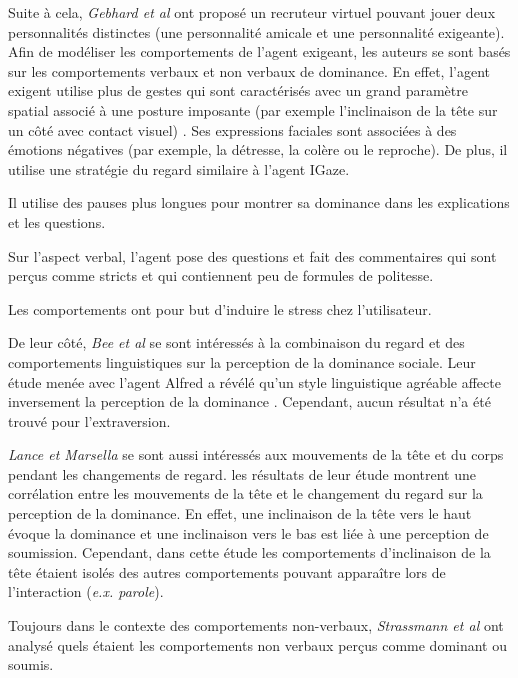 	Suite à cela, \emph{Gebhard et al} \cite{gebhard2014exploring} ont proposé un recruteur virtuel pouvant jouer deux personnalités distinctes (une personnalité amicale et une personnalité exigeante). Afin de modéliser les comportements de l'agent exigeant, les auteurs se sont basés sur les comportements verbaux et non verbaux de dominance. En effet, l'agent exigent utilise plus de gestes qui sont caractérisés avec un grand paramètre spatial associé à une posture imposante (par exemple l'inclinaison de la tête sur un côté avec  contact visuel) \cite{gebhard2014exploring}. Ses expressions faciales sont associées à des émotions négatives (par exemple, la détresse, la colère ou le reproche). De plus, il utilise une stratégie du regard similaire à l'agent IGaze.
	
	Il utilise des pauses plus longues pour montrer sa dominance dans les explications et les questions. 
	
	Sur l'aspect verbal, l'agent pose des questions et fait des commentaires qui sont perçus comme stricts et qui contiennent peu de formules de politesse. 
	
	Les comportements ont pour but d'induire le stress chez l'utilisateur. 
	
	De leur côté, \emph{Bee et al } \cite{bee2010bossy} se sont intéressés à la combinaison du regard et des comportements linguistiques sur la perception de la dominance sociale.  Leur étude menée avec l'agent Alfred a révélé qu'un style linguistique agréable affecte inversement la perception de la dominance \cite{bee2010bossy}. Cependant, aucun résultat n'a été trouvé pour l'extraversion.
	
	\emph{Lance et Marsella} \cite{lance2008relation,lance2007emotionally} se sont aussi intéressés aux mouvements de la tête et du corps pendant les changements de regard. les résultats de leur étude montrent une corrélation entre les mouvements de la tête et le changement du regard sur la perception de la dominance. En effet, une inclinaison de la tête vers le haut évoque la dominance et une inclinaison vers le bas est liée à une perception de soumission. Cependant, dans cette étude les comportements d'inclinaison de la tête étaient isolés des autres comportements pouvant apparaître lors de l'interaction (\emph{e.x. parole}).
	
	Toujours dans le contexte des comportements non-verbaux, \emph{Strassmann et al} \cite{strassmann2016effect} ont analysé quels étaient les comportements non verbaux perçus comme dominant ou soumis. 
	

